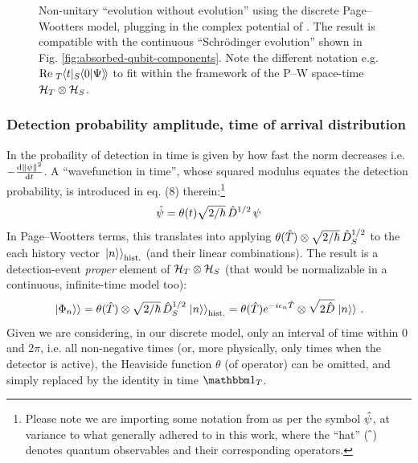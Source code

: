 \begin{figure}
\begin{subfigure}[b]{0.49\textwidth}
    \subcaption{}\label{fig:absorbed-qubit-components_pwlattice:im1}
  \end{subfigure}
  \caption[
    Non-unitary ``evolution without evolution'' (discrete).
  ]{
    Non-unitary ``evolution without evolution''
    using the discrete Page--Wootters model,
    plugging in
    the complex potential of \cite{RuschhauptAbsorption}.
    The result is compatible with the continuous
    ``Schr\"odinger evolution''
    shown in Fig. \ref{fig:absorbed-qubit-components}.
    Note the different notation e.g.
    $\mathrm{Re}{\;}_{T}\hspace{-.2em}\left\langle t | {}_{S}\hspace{-.2em}\left\langle 0 | \Psi \right\rangle\hspace{-.17em}\right\rangle$
    to fit within the framework of the P--W space-time $\mathcal{H}_T \otimes \mathcal{H}_S$.
  }
  \label{fig:absorbed-qubit-components_pwlattice}
\end{figure}

\subsubsection{Detection probability amplitude, time of arrival distribution}

In \cite{RuschhauptAbsorption} the probaility of detection in time is given
by how fast the norm decreases i.e. $-\dv{\norm{\psi}^2}{t}$.
A ``wavefunction in time'', whose squared modulus equates the detection probability,
is introduced in eq. (8) therein:\footnote{
  Please note we are importing some notation from \cite{RuschhauptAbsorption} as per the symbol $\hat{\psi}$,
  at variance to what generally adhered to in this work,
  where the ``hat'' ($\hat{\;}$) denotes quantum observables and their corresponding operators.
}
\begin{equation}
  \hat{\psi} = \theta(t) \sqrt{2/\hbar}\,\hat{D}^{1/2}\,\psi
\end{equation}
In Page--Wootters terms, this translates into applying
$\theta(\hat{T}) \otimes \sqrt{2/\hbar}\,\hat{D}^{1/2}_S$
to the each history vector $\left.\left| n \right\rangle\right\rangle_{\text{hist.}}$
(and their linear combinations).
The result is a detection-event \emph{proper} element of ${\mathcal{H}_T \otimes \mathcal{H}_S}$
(that would be normalizable in a continuous, infinite-time model too):
\begin{equation}\label{eq:qubit_detection_wavefunction}
  \left.\left| \Phi_n \right\rangle\right\rangle =
    \theta(\hat{T}) \otimes \sqrt{2/\hbar}\,\hat{D}^{1/2}_S \left.\left| n \right\rangle\right\rangle_{\text{hist.}} =
    \theta(\hat{T}) e^{-i\epsilon_{n}\hat{T}} \otimes \sqrt{2\hat{D}} \left.\left| n \right\rangle\right\rangle \, \text{.}
\end{equation}
Given we are considering, in our discrete model, only an interval of time within $0$ and $2\pi$,
i.e. all non-negative times (or, more physically, only times when the detector is active),
the Heaviside function $\theta$ (of operator) can be omitted, and simply replaced
by the identity in time $\idop_T$.

